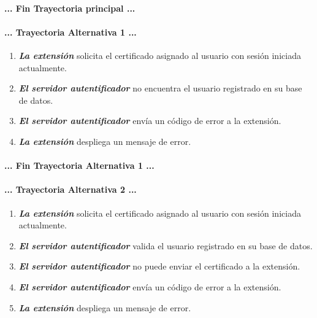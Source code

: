 \documentclass[12pt, a4paper, titlepage]{report}
\begin{document}
    		\paragraph{... Fin Trayectoria principal ...}
    		
    		\paragraph{... Trayectoria Alternativa 1 ...}
    		    \begin{enumerate}
    		        \item \textbf{\textit{La extensión}} solicita el certificado asignado al usuario con sesión iniciada actualmente.
    		        
    		        \item \textbf{\textit{El servidor autentificador}} no encuentra el usuario registrado en su base de datos.
    		        
    		        \item \textbf{\textit{El servidor autentificador}} envía un código de error a la extensión.
    		        
    		        \item \textbf{\textit{La extensión}} despliega un mensaje de error.
    		    \end{enumerate}
    		\paragraph{... Fin Trayectoria Alternativa 1 ...}
    		
    		\paragraph{... Trayectoria Alternativa 2 ...}
    		    \begin{enumerate}
    		        \item \textbf{\textit{La extensión}} solicita el certificado asignado al usuario con sesión iniciada actualmente.
    		        
    		        \item \textbf{\textit{El servidor autentificador}} valida el usuario registrado en su base de datos.
    		        
    		        \item \textbf{\textit{El servidor autentificador}} no puede enviar el certificado a la extensión.
    		        
    		        \item \textbf{\textit{El servidor autentificador}} envía un código de error a la extensión.
    		        
    		        \item \textbf{\textit{La extensión}} despliega un mensaje de error.
    		    \end{enumerate}
\end{document}
